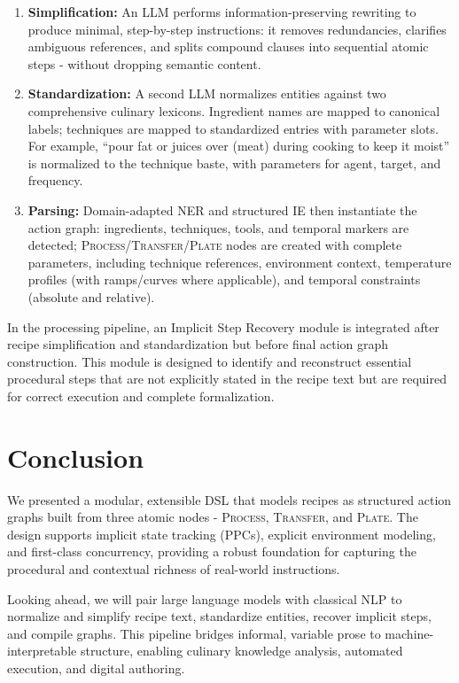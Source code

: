 \documentclass[sigconf]{acmart}
\begin{document}
\begin{enumerate}
    \item \textbf{Simplification:} An LLM performs information-preserving rewriting to produce minimal, step-by-step instructions: it removes redundancies, clarifies ambiguous references, and splits compound clauses into sequential atomic steps - without dropping semantic content.

    \item \textbf{Standardization:} A second LLM normalizes entities against two comprehensive culinary lexicons. Ingredient names are mapped to canonical labels; techniques are mapped to standardized entries with parameter slots. For example, ``pour fat or juices over (meat) during cooking to keep it moist'' is normalized to the technique baste, with parameters for agent, target, and frequency.

    \item \textbf{Parsing:} Domain-adapted NER and structured IE then instantiate the action graph: ingredients, techniques, tools, and temporal markers are detected; \textsc{Process}/\textsc{Transfer}/\textsc{Plate} nodes are created with complete parameters, including technique references, environment context, temperature profiles (with ramps/curves where applicable), and temporal constraints (absolute and relative).
\end{enumerate}

In the processing pipeline, an Implicit Step Recovery module is integrated after recipe simplification and standardization but before final action graph construction. This module is designed to identify and reconstruct essential procedural steps that are not explicitly stated in the recipe text but are required for correct execution and complete formalization. 

\section{Conclusion}

We presented a modular, extensible DSL that models recipes as structured action graphs built from three atomic nodes - \textsc{Process}, \textsc{Transfer}, and \textsc{Plate}. The design supports implicit state tracking (PPCs), explicit environment modeling, and first-class concurrency, providing a robust foundation for capturing the procedural and contextual richness of real-world instructions.

Looking ahead, we will pair large language models with classical NLP to normalize and simplify recipe text, standardize entities, recover implicit steps, and compile graphs. This pipeline bridges informal, variable prose to machine-interpretable structure, enabling culinary knowledge analysis, automated execution, and digital authoring.
\end{document}
